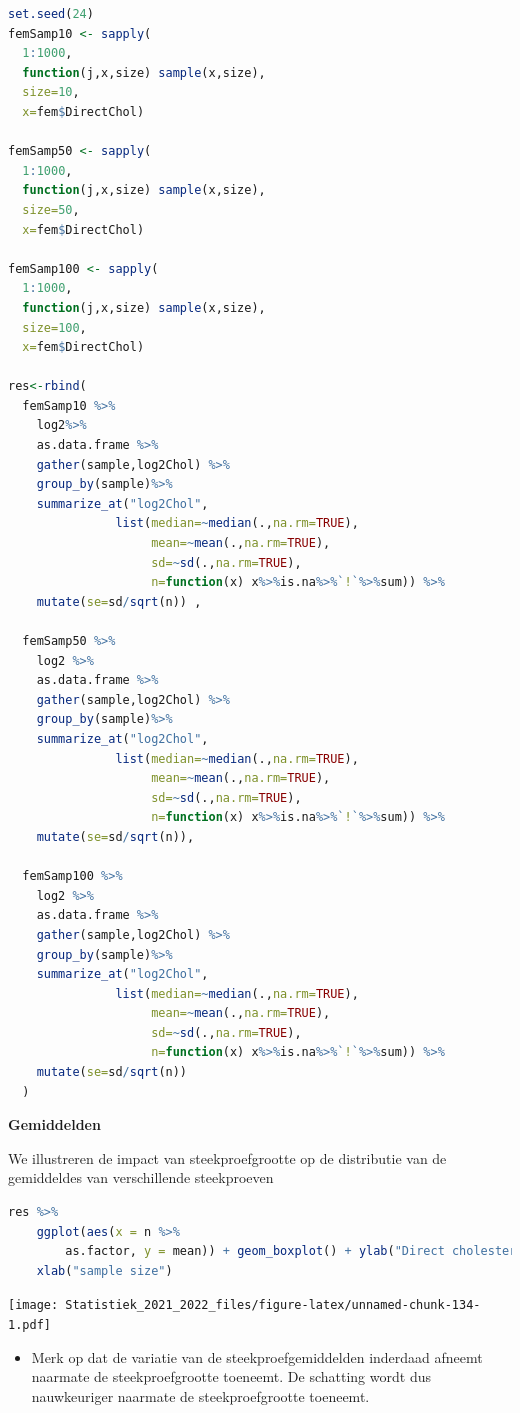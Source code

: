 \documentclass[
  12pt,dutch,coursenotes]{book}
\providecommand{\tightlist}{%
  \setlength{\itemsep}{0pt}\setlength{\parskip}{0pt}}
\theoremstyle{definition}
\theoremstyle{definition}
\theoremstyle{definition}
\theoremstyle{definition}
\theoremstyle{remark}
\begin{document}
\begin{lstlisting}[language=R]
set.seed(24)
femSamp10 <- sapply(
  1:1000,
  function(j,x,size) sample(x,size),
  size=10,
  x=fem$DirectChol)

femSamp50 <- sapply(
  1:1000,
  function(j,x,size) sample(x,size),
  size=50,
  x=fem$DirectChol)

femSamp100 <- sapply(
  1:1000,
  function(j,x,size) sample(x,size),
  size=100,
  x=fem$DirectChol)

res<-rbind(
  femSamp10 %>%
    log2%>%
    as.data.frame %>%
    gather(sample,log2Chol) %>%
    group_by(sample)%>%
    summarize_at("log2Chol",
               list(median=~median(.,na.rm=TRUE),
                    mean=~mean(.,na.rm=TRUE),
                    sd=~sd(.,na.rm=TRUE),
                    n=function(x) x%>%is.na%>%`!`%>%sum)) %>%
    mutate(se=sd/sqrt(n)) ,

  femSamp50 %>%
    log2 %>%  
    as.data.frame %>%
    gather(sample,log2Chol) %>%
    group_by(sample)%>%
    summarize_at("log2Chol",
               list(median=~median(.,na.rm=TRUE),
                    mean=~mean(.,na.rm=TRUE),
                    sd=~sd(.,na.rm=TRUE),
                    n=function(x) x%>%is.na%>%`!`%>%sum)) %>%
    mutate(se=sd/sqrt(n)),

  femSamp100 %>%
    log2 %>%
    as.data.frame %>%
    gather(sample,log2Chol) %>%
    group_by(sample)%>%
    summarize_at("log2Chol",
               list(median=~median(.,na.rm=TRUE),
                    mean=~mean(.,na.rm=TRUE),
                    sd=~sd(.,na.rm=TRUE),
                    n=function(x) x%>%is.na%>%`!`%>%sum)) %>%
    mutate(se=sd/sqrt(n))
  )
\end{lstlisting}

\textbf{Gemiddelden}

We illustreren de impact van steekproefgrootte op de distributie van de gemiddeldes van verschillende steekproeven

\begin{lstlisting}[language=R]
res %>%
    ggplot(aes(x = n %>%
        as.factor, y = mean)) + geom_boxplot() + ylab("Direct cholesterol (log2)") +
    xlab("sample size")
\end{lstlisting}

\texttt{[image: Statistiek\_2021\_2022\_files/figure-latex/unnamed-chunk-134-1.pdf]}

\begin{itemize}
\tightlist
\item
  Merk op dat de variatie van de steekproefgemiddelden inderdaad afneemt naarmate de steekproefgrootte toeneemt. De schatting wordt dus nauwkeuriger naarmate de steekproefgrootte toeneemt.
\end{itemize}
\end{document}
